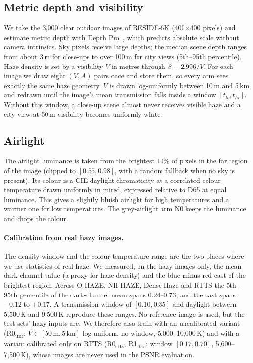 \documentclass{article}
\begin{document}
\subsection{Metric depth and visibility}
We take the 3{,}000 clear outdoor images of RESIDE-6K (400$\times$400 pixels) and estimate metric depth with Depth Pro~\cite{bochkovskii2025depthpro}, which predicts absolute scale without camera intrinsics. Sky pixels receive large depths; the median scene depth ranges from about 3\,m for close-ups to over 100\,m for city views (5th--95th percentile). Haze density is set by a visibility $V$ in metres through $\beta = 2.996/V$. For each image we draw eight $(V, A)$ pairs once and store them, so every arm sees exactly the same haze geometry. $V$ is drawn log-uniformly between 10\,m and 5\,km and redrawn until the image's mean transmission falls inside a window $[t_{lo}, t_{hi}]$. Without this window, a close-up scene almost never receives visible haze and a city view at 50\,m visibility becomes uniformly white.

\subsection{Airlight}
The airlight luminance is taken from the brightest 10\% of pixels in the far region of the image (clipped to $[0.55, 0.98]$, with a random fallback when no sky is present). Its colour is a CIE daylight chromaticity at a correlated colour temperature drawn uniformly in mired, expressed relative to D65 at equal luminance. This gives a slightly bluish airlight for high temperatures and a warmer one for low temperatures. The grey-airlight arm N0 keeps the luminance and drops the colour.

\paragraph{Calibration from real hazy images.} The density window and the colour-temperature range are the two places where we use statistics of real haze. We measured, on the hazy images only, the mean dark-channel value (a proxy for haze density) and the blue-minus-red cast of the brightest region. Across O-HAZE, NH-HAZE, Dense-Haze and RTTS the 5th--95th percentile of the dark-channel mean spans 0.24--0.73, and the cast spans $-0.12$ to $+0.17$. A transmission window of $[0.10, 0.85]$ and daylight between 5{,}500\,K and 9{,}500\,K reproduce these ranges. No reference image is used, but the test sets' hazy inputs are. We therefore also train with an uncalibrated variant (R0\textsubscript{unc}: $V\in[50\,\text{m}, 5\,\text{km}]$ log-uniform, no window, 5{,}000--10{,}000\,K) and with a variant calibrated only on RTTS (R0\textsubscript{rtts}, R1\textsubscript{rtts}: window $[0.17, 0.70]$, 5{,}600--7{,}500\,K), whose images are never used in the PSNR evaluation.
\end{document}
